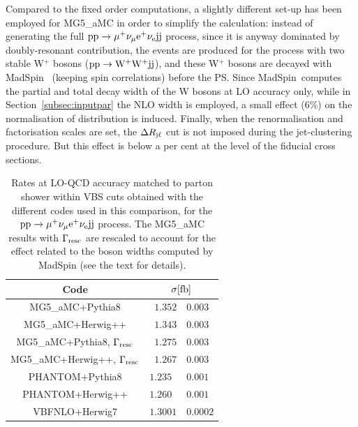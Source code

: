 Compared to the fixed order computations, a slightly different set-up has been employed for {\sc MG5\_aMC} in order to simplify the calculation: instead of generating the full
${\rm p}{\rm p}\to\mu^+\nu_\mu{\rm e}^+\nu_{\rm e}{\rm j}{\rm j}$ process, since it is anyway dominated by doubly-resonant contribution, the
events are produced for the process with two stable W$^+$ bosons (${\rm p}{\rm p}\to{\rm W^+}{\rm W^+}{\rm j}{\rm j}$), and these W$^+$ bosons
are decayed with {\sc MadSpin}~\cite{Artoisenet:2012st} (keeping spin correlations) before the PS. Since {\sc MadSpin}\ computes
the partial and total decay width of the W bosons at LO accuracy only, while in Section~\ref{subsec:inputpar} the NLO width is employed,
a small effect (6\%) on the normalisation of distribution is induced. Finally, when the renormalisation
and factorisation scales are set, the $\Delta R_{\text{j}\ell}$ cut is not imposed during the jet-clustering procedure.
But this effect is below a per cent at the level of the fiducial cross sections.

\begin{table}[h!]
    \centering
    \begin{tabular}{c|r@{ $\pm$ }l}
      Code  &  \multicolumn{2}{c}{$\sigma[\rm{fb}]$}  \\
        \hline\hline
        {\sc MG5\_aMC}+{\sc Pythia8}&  $1.352 $ & $0.003$  \\
        {\sc MG5\_aMC}+{\sc Herwig++}&  $1.343 $ & $ 0.003$  \\
        {\sc MG5\_aMC}+{\sc Pythia8}, $\Gamma_{\rm resc}$&  $1.275$ & $0.003$  \\
        {\sc MG5\_aMC}+{\sc Herwig++}, $\Gamma_{\rm resc}$&  $1.267$ & $ 0.003$  \\
        {\sc PHANTOM}+{\sc Pythia8} &  $1.235\phantom{0} $ & $0.001$  \\
        {\sc PHANTOM}+{\sc Herwig++} &  $1.260\phantom{0} $ & $0.001$  \\
        {\sc VBFNLO}+{\sc Herwig7} &  $1.3001$ & $0.0002$  \\
    \end{tabular}
    \caption{\label{tab:PSratesLO} Rates at LO-QCD accuracy matched to parton shower within VBS cuts obtained with the different codes used in this comparison,
    for the ${\rm p}{\rm p}\to\mu^+\nu_\mu{\rm e}^+\nu_{\rm e}{\rm j}{\rm j}$ process. The {\sc MG5\_aMC} results with $\Gamma_{\rm resc}$ 
    are rescaled to account for the effect related to the boson widths computed by {\sc MadSpin} (see the text for details).}
\end{table}

